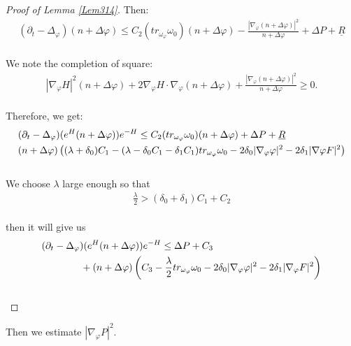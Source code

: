 \documentclass[11pt]{amsart}
\numberwithin{equation}{section}
\begin{document}
\begin{proof}[Proof of Lemma \ref{Lem314}]
Then:
\begin{align}
	(\partial_t - \Delta_{\varphi})(n+\Delta\varphi) \le  C_2(tr_{\omega_{\varphi}} \omega_0)(n+\Delta\varphi) - \frac{|\nabla_{\varphi}(n+\Delta\varphi)|^2}{n+\Delta\varphi} + \Delta P + \underline R
\end{align}\\
We note the completion of square:
\begin{align}
	|\nabla_{\varphi}H|^2(n+\Delta\varphi) + 2\nabla_{\varphi}H \cdot \nabla_{\varphi}(n+\Delta\varphi) + \frac{|\nabla_{\varphi}(n+\Delta\varphi)|^2}{n+\Delta\varphi} \ge  0.
\end{align}\\
Therefore, we get:
\begin{align}
	&(\partial_t - \Delta_{\varphi})(e^H(n+\Delta\varphi))e^{-H} \le  C_2(tr_{\omega_{\varphi}} \omega_0)(n+\Delta\varphi)  + \Delta P + \underline R \notag\\
	& (n+\Delta\varphi)\left( (\lambda+\delta_0)C_1 -(\lambda-\delta_0 C_1-\delta_1C_1)tr_{\omega_{\varphi}}\omega_0 -2\delta_0|\nabla_\varphi\varphi|^2-2\delta_1|\nabla\varphi F|^2 \right) \notag\\
\end{align}\\
We choose $\lambda$ large enough so that 
\begin{align}
	\frac{\lambda}{2}> (\delta_0+\delta_1)C_1+C_2
\end{align}\\
then it will give us 
\begin{align}
	&(\partial_t - \Delta_{\varphi})(e^H(n+\Delta\varphi))e^{-H} \le    \Delta P + C_3 \notag\\
	&\quad\quad\qquad + (n+\Delta\varphi)\left(C_3 - \frac{\lambda}{2}tr_{\omega_{\varphi}}\omega_0 - 2\delta_0|\nabla_{\varphi}\varphi|^2 - 2\delta_1|\nabla_{\varphi}F|^2 \right) 
\end{align}\\
\end{proof}








\noindent
Then we estimate $|\nabla_\varphi P|^2$.  \\
\end{document}
